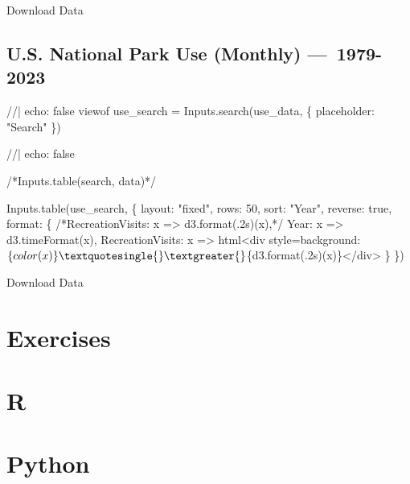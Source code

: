 \documentclass[
  letterpaper,
  DIV=11,
  numbers=noendperiod]{scrartcl}
\newenvironment{Shaded}{\begin{snugshade}}{\end{snugshade}}
\newcommand{\NormalTok}[1]{\textcolor[rgb]{0.00,0.23,0.31}{#1}}
\begin{document}
Download Data

\subsection{U.S. National Park Use (Monthly)
---~1979-2023}\label{u.s.-national-park-use-monthly-1979-2023}

\begin{Shaded}
\begin{Highlighting}[]
\NormalTok{//| echo: false}
\NormalTok{viewof use\_search = Inputs.search(use\_data, \{}
\NormalTok{  placeholder: "Search"}
\NormalTok{\})}
\end{Highlighting}
\end{Shaded}

\begin{Shaded}
\begin{Highlighting}[]
\NormalTok{//| echo: false}

\NormalTok{/*Inputs.table(search, data)*/}

\NormalTok{Inputs.table(use\_search, \{}
\NormalTok{  layout: "fixed",}
\NormalTok{  rows: 50,}
\NormalTok{  sort: "Year",}
\NormalTok{  reverse: true,}
\NormalTok{  format: \{}
\NormalTok{    /*RecreationVisits: x =\textgreater{} d3.format(\textquotesingle{}.2s\textquotesingle{})(x),*/}
\NormalTok{    Year: x =\textgreater{} d3.timeFormat(x),}
\NormalTok{    RecreationVisits: x =\textgreater{} html\textasciigrave{}\textless{}div style=\textquotesingle{}background:$\{color(x)\}\textquotesingle{}\textgreater{}$\{d3.format(\textquotesingle{}.2s\textquotesingle{})(x)\}\textless{}/div\textgreater{}\textasciigrave{}}
\NormalTok{  \}}
\NormalTok{\})}
\end{Highlighting}
\end{Shaded}

Download Data

\section{Exercises}

\section{R}

\label{exercise-posts}

\section{Python}
\end{document}

